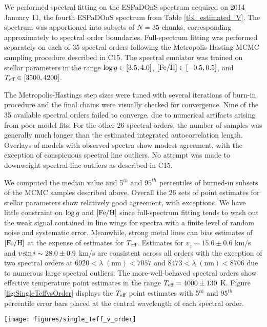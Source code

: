 \documentclass[twocolumn]{emulateapj}%
\newcommand{\iancze}{{\sc C15}}
\begin{document}
We performed spectral fitting on the ESPaDOnS spectrum acquired on 2014 January 11, the fourth ESPaDOnS spectrum from Table \ref{tbl_estimated_V}.  The spectrum was apportioned into subsets of $N=35$ chunks, corresponding approximately to spectral order boundaries.  Full-spectrum fitting was performed separately on each of 35 spectral orders following the Metropolis-Hasting MCMC sampling procedure described in \iancze.  The spectral emulator was trained on stellar parameters in the range $\log g \in [3.5, 4.0]$, $[{\rm Fe}/{\rm H}] \in [-0.5, 0.5]$, and $T_\textrm{eff} \in [3500, 4200]$.

The Metropolis-Hastings step sizes were tuned with several iterations of burn-in procedure and the final chains were visually checked for convergence.  Nine of the 35 available spectral orders failed to converge, due to numerical artifacts arising from poor model fits.  For the other 26 spectral orders, the number of samples was generally much longer than the estimated integrated autocorrelation length.  Overlays of models with observed spectra show modest agreement, with the exception of conspicuous spectral line outliers.  No attempt was made to downweight spectral-line outliers as described in \iancze.  

We computed the median value and 5$^{th}$ and $95^{th}$ percentiles of burned-in subsets of the MCMC samples described above.  Overall the 26 sets of point estimates for stellar parameters show relatively good agreement, with exceptions.  We have little constraint on $\log g$ and $[{\rm Fe}/{\rm H}]$ since full-spectrum fitting tends to wash out the weak signal contained in line wings for spectra with a finite level of random noise and systematic error.  Meanwhile, strong metal lines can bias estimates of $[{\rm Fe}/{\rm H}]$ at the expense of estimates for $T_\textrm{eff}$.  Estimates for $v_z \sim 15.6 \pm 0.6$ km/s and $v \sin i \sim 28.0 \pm 0.9$ km/s are consistent across all orders with the exception of two spectral orders at $6920 <\lambda \;(\mathrm{nm})< 7057$ and $8473 < \lambda \;(\mathrm{nm}) < 8706$ due to numerous large spectral outliers.  The more-well-behaved spectral orders show effective temperature point estimates in the range $T_\textrm{eff}=4000\pm130$ K.  Figure \ref{fig:SingleTeffvsOrder} displays the $T_\textrm{eff}$ point estimates with 5$^{th}$ and $95^{th}$ percentile error bars placed at the central wavelength of each spectral order.

\begin{figure*}
	\centering
	\texttt{[image: figures/single\_Teff\_v\_order]}
	\caption{Effective temperature as derived from unique full spectrum fitting to each of 58 spectral orders in the optical through infrared portions of the spectrum and assuming a single component photosphere.  The top panel indicates the location and size of spectral chunks used to derive the values in the bottom panel.  The IGRINS orders also show typical atmospheric transmission (red lines) in the infrared.  Unused spectral chunks are lightened.  The effective temperature derived in the $K-$band is about 800 K lower than that derived in optical.}
	\label{fig:SingleTeffvsOrder}
\end{figure*}
\end{document}

